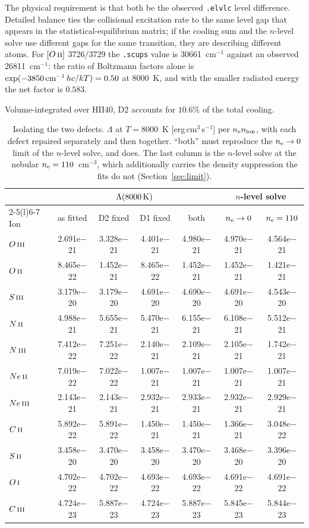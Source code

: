 \documentclass[english,a4paper]{my_memo}
\newcommand{\code}[1]{\texttt{#1}}
\newcommand{\OI}{O\,\textsc{i}}
\newcommand{\OII}{O\,\textsc{ii}}
\newcommand{\OIII}{O\,\textsc{iii}}
\newcommand{\NII}{N\,\textsc{ii}}
\newcommand{\NIII}{N\,\textsc{iii}}
\newcommand{\CII}{C\,\textsc{ii}}
\newcommand{\CIII}{C\,\textsc{iii}}
\newcommand{\SII}{S\,\textsc{ii}}
\newcommand{\SIII}{S\,\textsc{iii}}
\newcommand{\NeII}{Ne\,\textsc{ii}}
\newcommand{\NeIII}{Ne\,\textsc{iii}}
\newcommand{\nel}{n_{\rm e}}
\begin{document}
The physical requirement is that both be the observed \code{.elvlc} level
difference.  Detailed balance ties the collisional excitation rate to the same
level gap that appears in the statistical-equilibrium matrix; if the cooling
sum and the $n$-level solve use different gaps for the same transition, they
are describing different atoms.  For $[\OII{}]$ 3726/3729 the \code{.scups}
value is 30661~cm$^{-1}$ against an observed 26811~cm$^{-1}$: the ratio of
Boltzmann factors alone is $\exp(-3850\,{\rm cm^{-1}}\,hc/kT) = 0.50$ at
8000~K, and with the smaller radiated energy the net factor is $0.583$.

Volume-integrated over HII40, D2 accounts for $10.6\%$ of the total cooling.

\begin{table}[htbp]
\centering
\caption{Isolating the two defects.  $\Lambda$ at $T = 8000$~K
[erg\,cm$^3$\,s$^{-1}$] per $\nel n_{\rm ion}$, with each defect repaired
separately and then together.  ``both'' must reproduce the $\nel \to 0$ limit
of the $n$-level solve, and does.  The last column is the $n$-level solve at
the nebular $\nel = 110$~cm$^{-3}$, which additionally carries the density
suppression the fits do not (Section~\ref{sec:limit}).}
\label{tab:isolate}
\begin{tabular}{lcccc@{\hspace{2em}}cc}
\toprule
 & \multicolumn{4}{c}{$\Lambda(8000\,{\rm K})$} & \multicolumn{2}{c}{$n$-level solve} \\
\cmidrule(r){2-5}\cmidrule(l){6-7}
Ion & as fitted & D2 fixed & D1 fixed & both & $\nel \to 0$ & $\nel = 110$ \\
\midrule
$\OIII{}$  & 2.691e$-$21 & 3.328e$-$21 & 4.401e$-$21 & 4.980e$-$21 & 4.970e$-$21 & 4.564e$-$21 \\
$\OII{}$   & 8.465e$-$22 & 1.452e$-$21 & 8.465e$-$22 & 1.452e$-$21 & 1.452e$-$21 & 1.421e$-$21 \\
$\SIII{}$  & 3.179e$-$20 & 3.179e$-$20 & 4.691e$-$20 & 4.690e$-$20 & 4.691e$-$20 & 4.543e$-$20 \\
$\NII{}$   & 4.988e$-$21 & 5.655e$-$21 & 5.470e$-$21 & 6.155e$-$21 & 6.108e$-$21 & 5.512e$-$21 \\
$\NIII{}$  & 7.412e$-$22 & 7.251e$-$22 & 2.140e$-$21 & 2.109e$-$21 & 2.105e$-$21 & 1.742e$-$21 \\
$\NeII{}$  & 7.019e$-$22 & 7.022e$-$22 & 1.007e$-$21 & 1.007e$-$21 & 1.007e$-$21 & 1.007e$-$21 \\
$\NeIII{}$ & 2.143e$-$21 & 2.143e$-$21 & 2.932e$-$21 & 2.933e$-$21 & 2.932e$-$21 & 2.929e$-$21 \\
$\CII{}$   & 5.892e$-$22 & 5.891e$-$22 & 1.450e$-$21 & 1.450e$-$21 & 1.366e$-$21 & 3.048e$-$22 \\
$\SII{}$   & 3.458e$-$20 & 3.470e$-$20 & 3.458e$-$20 & 3.470e$-$20 & 3.468e$-$20 & 3.396e$-$20 \\
$\OI{}$    & 4.702e$-$22 & 4.702e$-$22 & 4.693e$-$22 & 4.693e$-$22 & 4.691e$-$22 & 4.691e$-$22 \\
$\CIII{}$  & 4.724e$-$23 & 5.887e$-$23 & 4.724e$-$23 & 5.887e$-$23 & 5.845e$-$23 & 5.844e$-$23 \\
\bottomrule
\end{tabular}
\end{table}
\end{document}
